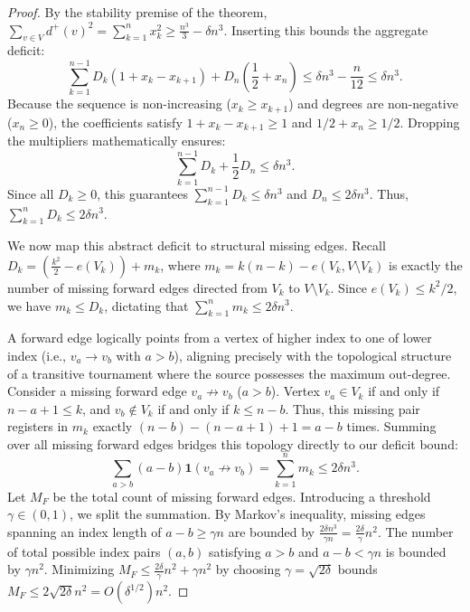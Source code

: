 \documentclass[a4paper]{amsart}
\begin{document}
\begin{proof}
By the stability premise of the theorem,
$\sum_{v \in V} d^+(v)^2 = \sum_{k=1}^n x_k^2 \ge \frac{n^3}{3} - \delta n^3$.
Inserting this bounds the aggregate deficit:
\begin{equation}
\sum_{k=1}^{n-1} D_k (1 + x_k - x_{k+1}) + D_n \left( \frac{1}{2} + x_n \right) \le \delta n^3 - \frac{n}{12} \le \delta n^3.
\end{equation}
Because the sequence is non-increasing ($x_k \ge x_{k+1}$) and degrees are non-negative ($x_n \ge 0$),
the coefficients satisfy $1 + x_k - x_{k+1} \ge 1$ and $1/2 + x_n \ge 1/2$.
Dropping the multipliers mathematically ensures:
\begin{equation} \label{eq:sum_D_bound}
\sum_{k=1}^{n-1} D_k + \frac{1}{2} D_n \le \delta n^3.
\end{equation}
Since all $D_k \ge 0$,
this guarantees $\sum_{k=1}^{n-1} D_k \le \delta n^3$ and $D_n \le 2\delta n^3$.
Thus, $\sum_{k=1}^n D_k \le 2\delta n^3$.

We now map this abstract deficit to structural missing edges.
Recall $D_k = \left(\frac{k^2}{2} - e(V_k)\right) + m_k$,
where $m_k = k(n-k) - e(V_k, V \setminus V_k)$ is exactly the number of missing forward edges directed from $V_k$ to $V \setminus V_k$.
Since $e(V_k) \le k^2/2$, we have $m_k \le D_k$,
dictating that $\sum_{k=1}^n m_k \le 2\delta n^3$. 

A forward edge logically points from a vertex of higher index to one of lower index (i.e., $v_a \to v_b$ with $a > b$),
aligning precisely with the topological structure of a transitive tournament where the source possesses the maximum out-degree.
Consider a missing forward edge $v_a \not\to v_b$ ($a > b$).
Vertex $v_a \in V_k$ if and only if $n-a+1 \le k$,
and $v_b \notin V_k$ if and only if $k \le n-b$.
Thus, this missing pair registers in $m_k$ exactly $(n-b) - (n-a+1) + 1 = a - b$ times.
Summing over all missing forward edges bridges this topology directly to our deficit bound:
\begin{equation}
\sum_{a > b} (a - b) \mathbf{1}(v_a \not\to v_b) = \sum_{k=1}^n m_k \le 2\delta n^3.
\end{equation}
Let $M_F$ be the total count of missing forward edges.
Introducing a threshold $\gamma \in (0, 1)$, we split the summation.
By Markov's inequality, missing edges spanning an index length of $a - b \ge \gamma n$ are bounded by $\frac{2\delta n^3}{\gamma n} = \frac{2\delta}{\gamma} n^2$.
The number of total possible index pairs $(a,b)$ satisfying $a > b$ and $a - b < \gamma n$ is bounded by $\gamma n^2$.
Minimizing $M_F \le \frac{2\delta}{\gamma} n^2 + \gamma n^2$ by choosing $\gamma = \sqrt{2\delta}$ bounds $M_F \le 2\sqrt{2\delta}n^2 = O(\delta^{1/2})n^2$.


\end{proof}
\end{document}
